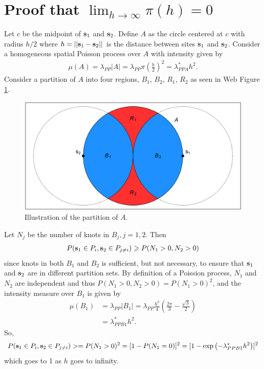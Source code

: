 \documentclass[useAMS,usenatbib,referee]{biomweb}
\begin{document}
\section{Proof that $\lim_{h \rightarrow \infty} \pi(h) = 0$} \label{a:proofsamepartition}
Let $c$ be the midpoint of $\mbox{\bf s}_1$ and $\mbox{\bf s}_2$.
Define $A$ as the circle centered at $c$ with radius $h / 2$ where $h = ||\mbox{\bf s}_1 - \mbox{\bf s}_2||$ is the distance between sites $\mbox{\bf s}_1$ and $\mbox{\bf s}_2$.
Consider a homogeneous spatial Poisson process over $A$ with intensity given by
\begin{align*}
  \mu(A) = \lambda_{PP} |A| = \lambda_{PP} \pi \left(\frac{h}{2}\right)^2 = \lambda_{PPA}^* h^2.
\end{align*}
Consider a partition of $A$ into four regions, $B_1$, $B_2$, $R_1$, $R_2$ as seen in Web Figure \ref{fig:hpp}.
\begin{figure}
  \includegraphics[width=\linewidth]{plots/circles}
  \caption{Illustration of the partition of $A$.}
  \label{fig:hpp}
\end{figure}
Let $N_j$ be the number of knots in $B_j, j = 1, 2$.
Then
\begin{align}
  P(\mbox{\bf s}_1 \in P_i, \mbox{\bf s}_2 \in P_{j \neq i}) \geqslant P(N_1 > 0, N_2 > 0)
\end{align}
since knots in both $B_1$ and $B_2$ is sufficient, but not necessary, to ensure that $\mbox{\bf s}_1$ and $\mbox{\bf s}_2$ are in different partition sets.
By definition of a Poission process, $N_1$ and $N_2$ are independent and thus $P(N_1 > 0, N_2 > 0) = P(N_1 > 0)^2$, and the intensity measure over $B_1$ is given by
\begin{align}
  \mu(B_1) &= \lambda_{PP} |B_1| = \lambda_{PP} \frac{h^2}{4} \left(\frac{2 \pi}{3} - \frac{\sqrt{3}}{2} \right) \nonumber \\
       &= \lambda^*_{PPB1} h^2.
\end{align}
So,
\begin{align}
  P(\mbox{\bf s}_1 \in P_i, \mbox{\bf s}_2 \in P_{j \neq i}) >= P(N_1 > 0)^2 = [1 - P(N_1 = 0)]^2 = [1 - \exp\left(-\lambda^*_{PPB1} h^2\right)]^2
\end{align}
which goes to 1 as $h$ goes to infinity.
\end{document}
